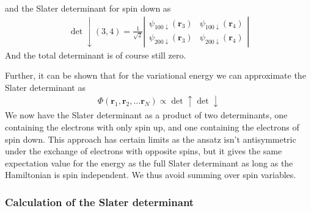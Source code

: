 \documentclass[11pt]{article}
\begin{document}
			and the Slater determinant for spin down as
			\begin{align}
				\det\downarrow(3,4)=\frac{1}{\sqrt{2}}\left|\begin{array}{cc}
				\psi_{100\downarrow}(\mathbf{r}_{3}) & \psi_{100\downarrow}(\mathbf{r}_{4})\\
				\psi_{200\downarrow}(\mathbf{r}_{3}) & \psi_{200\downarrow}(\mathbf{r}_{4})
				\end{array}\right|
			\end{align}
			And the total determinant is of course still zero.

			Further, it can be shown that for the variational energy we can approximate
			the Slater determinant as
			\begin{align}
				\Phi(\mathbf{r}_{1},\mathbf{r}_{2},\dots\mathbf{r}_{N})\propto\det\uparrow\det\downarrow
			\end{align}
			We now have the Slater determinant as a product of two determinants,
			one containing the electrons with only spin up, and one containing
			the electrons of spin down. This approach has certain limits as the
			ansatz isn't antisymmetric under the exchange of electrons with opposite
			spins, but it gives the same expectation value for the energy as the
			full Slater determinant as long as the Hamiltonian is spin independent.
			We thus avoid summing over spin variables.

		\subsubsection{Calculation of the Slater determinant}
\end{document}
